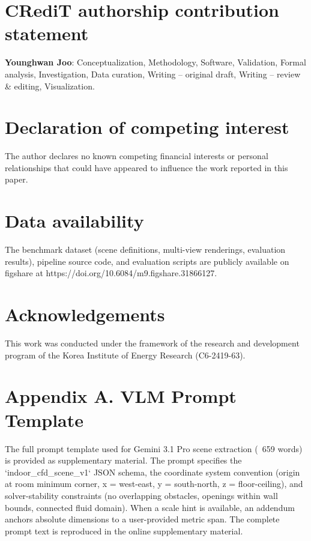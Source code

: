 \documentclass[preprint,12pt,number]{elsarticle}
\begin{document}
\section*{CRediT authorship contribution statement}


\textbf{Younghwan Joo}: Conceptualization, Methodology, Software, Validation, Formal analysis, Investigation, Data curation, Writing -- original draft, Writing -- review \& editing, Visualization.


\section*{Declaration of competing interest}


The author declares no known competing financial interests or personal relationships that could have appeared to influence the work reported in this paper.


\section*{Data availability}


The benchmark dataset (scene definitions, multi-view renderings, evaluation results), pipeline source code, and evaluation scripts are publicly available on figshare at https://doi.org/10.6084/m9.figshare.31866127.


\section*{Acknowledgements}


This work was conducted under the framework of the research and development program of the Korea Institute of Energy Research (C6-2419-63).



\section{Appendix A. VLM Prompt Template}
\label{sec:appendix-a-vlm-prompt-template}


The full prompt template used for Gemini 3.1 Pro scene extraction (~659 words) is provided as supplementary material. The prompt specifies the `indoor\_cfd\_scene\_v1` JSON schema, the coordinate system convention (origin at room minimum corner, x = west-east, y = south-north, z = floor-ceiling), and solver-stability constraints (no overlapping obstacles, openings within wall bounds, connected fluid domain). When a scale hint is available, an addendum anchors absolute dimensions to a user-provided metric span. The complete prompt text is reproduced in the online supplementary material.
\end{document}
